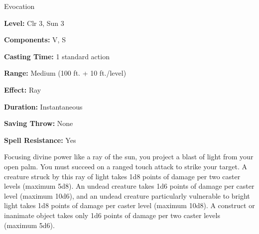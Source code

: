 
Evocation

\textbf{Level:} Clr 3, Sun 3

\textbf{Components:} V, S

\textbf{Casting Time:} 1 standard action

\textbf{Range:} Medium (100 ft. + 10 ft./level)

\textbf{Effect:} Ray

\textbf{Duration:} Instantaneous

\textbf{Saving Throw:} None

\textbf{Spell Resistance:} Yes

Focusing divine power like a ray of the sun, you project a blast of light from 
your open palm. You must succeed on a ranged touch attack to strike your target. 
A creature struck by this ray of light takes 1d8 points of damage per two caster 
levels (maximum 5d8). An undead creature takes 1d6 points of damage per caster 
level (maximum 10d6), and an undead creature particularly vulnerable to bright 
light takes 1d8 points of damage per caster level (maximum 10d8). A construct or 
inanimate object takes only 1d6 points of damage per two caster levels (maximum 
5d6).

